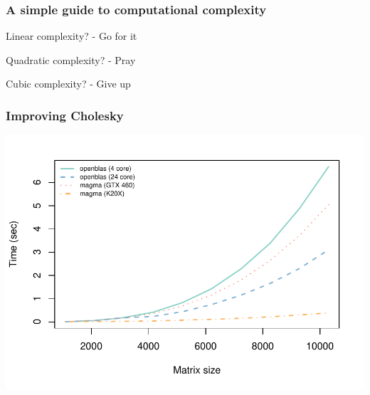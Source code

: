 \documentclass[t]{beamer}\usepackage[]{graphicx}\usepackage[]{color}
\newenvironment{knitrout}{}{} %
\begin{document}

\begin{frame}[c]
\frametitle{A simple guide to computational complexity}

{\Large \begin{center}
\vfill
Linear complexity? \pause- Go for it \pause

\vspace{15mm}

Quadratic complexity? \pause- Pray \pause

\vspace{15mm}

Cubic complexity? \pause- Give up

\vfill
\end{center} }
\end{frame}


\begin{frame}
\frametitle{Improving Cholesky}
    
\vspace{-8mm}

\begin{center}
\begin{knitrout}\footnotesize
{}\color{fgcolor}

{\centering \includegraphics[width=\textwidth]{plots/unnamed-chunk-1-1} 

}



\end{knitrout}
\end{center}


\end{frame}
\end{document}
